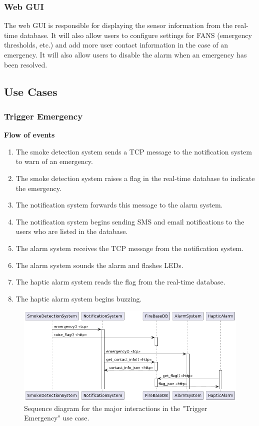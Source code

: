 \subsubsection{Web GUI}

The web GUI is responsible for displaying the sensor information from the real-time database. It will also allow users
to configure settings for FANS (emergency thresholds, etc.) and add more user contact information in the case of an
emergency. It will also allow users to disable the alarm when an emergency has been resolved.

\subsection{Use Cases}

\subsubsection{Trigger Emergency}

\textbf{Flow of events}
\begin{enumerate}
    \item The smoke detection system sends a TCP message to the notification system to warn of an emergency.
    \item The smoke detection system raises a flag in the real-time database to indicate the emergency.
    \item The notification system forwards this message to the alarm system.
    \item The notification system begins sending SMS and email notifications to the users who are listed in the database.
    \item The alarm system receives the TCP message from the notification system.
    \item The alarm system sounds the alarm and flashes LEDs.
    \item The haptic alarm system reads the flag from the real-time database.
    \item The haptic alarm system begins buzzing.
\end{enumerate}

\begin{figure}[H]
    \centering
    \includegraphics[width=\linewidth]{../assets/FANSAlarmUseCaseSequence.png}
    \caption{Sequence diagram for the major interactions in the "Trigger Emergency" use case.}
\end{figure}
